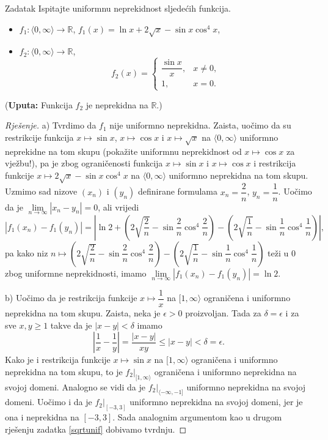 \begin{exercise}{Zadatak}
Ispitajte uniformnu neprekidnost sljedećih funkcija.
\begin{itemize}
\item[a)] \(f_1 : \langle 0,\infty\rangle\to \mathbb{R}\), \(f_1(x)=\ln{x}+2\sqrt{x}-\sin{x}\cos^4{x}\),
\item[b)] \(f_2 : \langle 0, \infty\rangle\to \mathbb{R}\),
\[f_2(x)=\begin{cases}
\dfrac{\sin{x}}{x}, & x\neq 0,\\
1, & x=0.
\end{cases}\] 
\end{itemize}
(\textbf{Uputa:} Funkcija \(f_2\) je neprekidna na \(\mathbb{R}\).)
\end{exercise}
\begin{proof}[Rješenje]
a) Tvrdimo da \(f_1\) nije uniformno neprekidna. Zaista, uočimo da su restrikcije funkcija \(x\mapsto \sin{x}\), \(x\mapsto \cos{x}\) i \(x\mapsto \sqrt{x}\) na \(\langle 0, \infty\rangle\) uniformno neprekidne na tom skupu (pokažite uniformnu neprekidnost od \(x\mapsto \cos{x}\) za vježbu!), pa je zbog ograničenosti funkcija \(x\mapsto \sin{x}\) i \(x\mapsto \cos{x}\) i restrikcija funkcije \(x\mapsto 2\sqrt{x}-\sin{x}\cos^4{x}\) na \(\langle 0, \infty\rangle\) uniformno neprekidna na tom skupu. Uzmimo sad nizove \((x_n)\) i \((y_n)\) definirane formulama \(x_n=\dfrac{2}{n}\), \(y_n=\dfrac{1}{n}\). Uočimo da je \(\lim\limits_{n\to \infty}{|x_n-y_n|}=0\), ali vrijedi
\[\left\lvert f_1(x_n)-f_1(y_n)\right\rvert=\left\lvert \ln{2}+\left(2\sqrt{\dfrac{2}{n}}-\sin{\dfrac{2}{n}\cos^4{\dfrac{2}{n}}}\right)-\left(2\sqrt{\dfrac{1}{n}}-\sin{\dfrac{1}{n}}\cos^4{\dfrac{1}{n}}\right)\right\rvert,\]
pa kako niz \(n\mapsto \left(2\sqrt{\dfrac{2}{n}}-\sin{\dfrac{2}{n}\cos^4{\dfrac{2}{n}}}\right)-\left(2\sqrt{\dfrac{1}{n}}-\sin{\dfrac{1}{n}}\cos^4{\dfrac{1}{n}}\right)\) teži u \(0\) zbog uniformne neprekidnosti, imamo \(\lim\limits_{n\to \infty}{\left\lvert f_1(x_n)-f_1(y_n)\right\rvert}=\ln{2}\).

b) Uočimo da je restrikcija funkcije \(x\mapsto \dfrac{1}{x}\) na \([1, \infty\rangle\) ograničena i uniformno neprekidna na tom skupu. Zaista, neka je \(\epsilon>0\) proizvoljan. Tada za \(\delta=\epsilon\) i za sve \(x, y\geq 1\) takve da je \(|x-y|<\delta\) imamo
\[\left\lvert \dfrac{1}{x}-\dfrac{1}{y}\right\rvert=\dfrac{\left\lvert x-y\right\rvert}{xy}\leq |x-y|<\delta=\epsilon.\]
Kako je i restrikcija funkcije \(x\mapsto \sin{x}\) na \([1, \infty\rangle\) ograničena i uniformno neprekidna na tom skupu, to je \(f_2|_{[1,\infty\rangle}\) ograničena i uniformno neprekidna na svojoj domeni. Analogno se vidi da je \(f_2|_{\langle -\infty, -1]}\) uniformno neprekidna na svojoj domeni. Uočimo i da je \(f_2|_{[-3, 3]}\) uniformno neprekidna na svojoj domeni, jer je ona i neprekidna na \([-3, 3]\). Sada analognim argumentom kao u drugom rješenju zadatka \ref{sqrtunif} dobivamo tvrdnju.
\end{proof}
